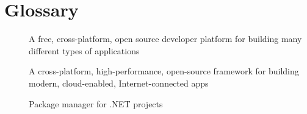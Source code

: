 \chapter*{Glossary}

\begin{multicols}{2}
    \raggedright
    \begin{description}
        \item [] A free, cross-platform, open source developer platform for building many different types of applications
        \item [] A cross-platform, high-performance, open-source framework for building modern, cloud-enabled, Internet-connected apps
        \item [] Package manager for .NET projects
    \end{description}
\end{multicols}